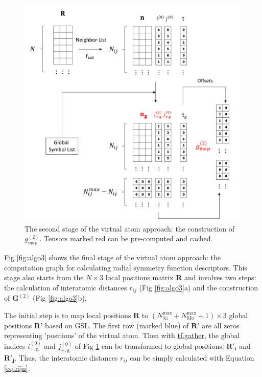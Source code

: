 \documentclass[preprint]{revtex4-2}
\begin{document}
\begin{figure}[h!]
\centering
\includegraphics[scale=0.6]{figures/Fig2-v2gmap.pdf}
\caption{\label{fig:algo2} The second stage of the virtual atom approach: the 
construction of $g_{\mathrm{map}}^{(2)}$. Tensors marked red can be pre-computed 
and cached.}
\end{figure}

Fig \ref{fig:algo3} shows the final stage of the virtual atom approach: the 
computation graph for calculating radial symmetry function descriptors. This 
stage also starts from the $N \times 3$ local positions matrix \textbf{R} and 
involves two steps: the calculation of interatomic distances $r_{ij}$ 
(Fig \ref{fig:algo3}a) and the construction of $\mathbf{G}^{(2)}$ 
(Fig \ref{fig:algo3}b).

The initial step is to map local positions \textbf{R} to
$(N_{\mathrm{Ni}}^{\mathrm{max}}+N_{\mathrm{Mo}}^{\mathrm{max}}+1) \times 3$
global positions \textbf{R'} based on GSL. The first row (marked blue) of 
$\mathbf{R'}$ are all zeros representing 'positions' of the virtual atom. 
Then with 
\href{https://www.tensorflow.org/versions/r1.12/api_docs/python/tf/gather}
{tf.gather}, the global indices $i^{(0)}_{\mathrm{+,g}}$ and 
$j^{(0)}_{\mathrm{+,g}}$ of Fig \ref{fig:algo2} can be transformed to global 
positions: $\mathbf{R'_i}$ and $\mathbf{R'_j}$. Thus, the interatomic distances 
$r_{ij}$ can be simply calculated with Equation \ref{eq:rijn}.
\end{document}
